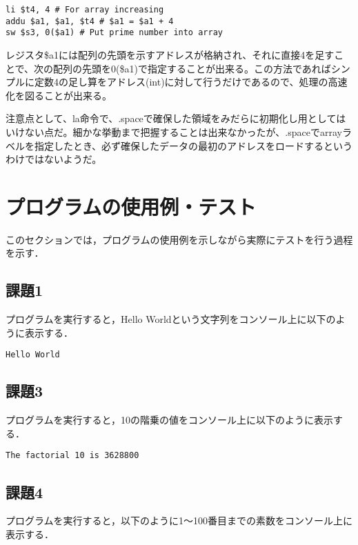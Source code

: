 \documentclass[a4j]{jarticle}
\begin{document}
\begin{lstlisting}
li $t4, 4 # For array increasing
addu $a1, $a1, $t4 # $a1 = $a1 + 4
sw $s3, 0($a1) # Put prime number into array
\end{lstlisting}

レジスタ\$a1には配列の先頭を示すアドレスが格納され、それに直接4を足すことで、次の配列の先頭を0(\$a1)で指定することが出来る。この方法であればシンプルに定数4の足し算をアドレス(int)に対して行うだけであるので、処理の高速化を図ることが出来る。

注意点として、la命令で、.spaceで確保した領域をみだらに初期化し用としてはいけない点だ。細かな挙動まで把握することは出来なかったが、.spaceでarrayラベルを指定したとき、必ず確保したデータの最初のアドレスをロードするというわけではないようだ。


%
%

\section{プログラムの使用例・テスト}

このセクションでは，プログラムの使用例を示しながら実際にテストを行う過程を示す．

\subsection{課題1}

プログラムを実行すると，Hello Worldという文字列をコンソール上に以下のように表示する．

{\baselineskip 3mm
\begin{verbatim}
Hello World
\end{verbatim}
}


\subsection{課題3}

プログラムを実行すると，10の階乗の値をコンソール上に以下のように表示する．

{\baselineskip 3mm
\begin{verbatim}
The factorial 10 is 3628800
\end{verbatim}
}


\subsection{課題4}

プログラムを実行すると，以下のように1〜100番目までの素数をコンソール上に表示する．  
\end{document}
